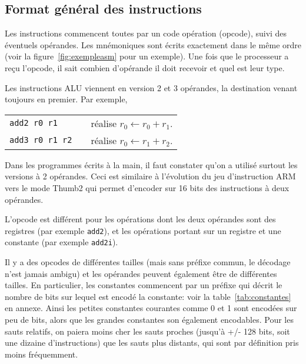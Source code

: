\documentclass[architecture]{compas2018}
\newcommand{\todo}[1]{\textcolor{red}{TODO: #1}}
\begin{document}

\subsection{Format général des instructions}
Les instructions commencent toutes par un code opération (opcode), suivi des éventuels opérandes.
Les mnémoniques sont écrits exactement dans le même ordre (voir la figure~\ref{fig:exempleasm} pour un exemple).  
Une fois que le processeur a reçu l'opcode, il sait combien d'opérande il doit recevoir et quel est leur type.


Les instructions ALU viennent en version 2 et 3 opérandes, la destination venant toujours en premier.
Par exemple, \\
  \begin{tabular}{lcl}
 \texttt{add2 r0 r1}&& réalise $r_0 \leftarrow r_0+r_1$. \\
 \texttt{add3 r0 r1 r2}&& réalise $r_0 \leftarrow r_1+r_2$.
  \end{tabular}
  
  Dans les programmes écrits à la main, il faut constater qu'on a utilisé surtout les versions à 2 opérandes.
  Ceci est similaire à l'évolution du jeu d'instruction ARM vers le mode Thumb2 qui permet d'encoder sur 16 bits des instructions à deux opérandes. 
  
 L'opcode est différent pour les opérations dont les deux opérandes  sont des registres (par exemple \texttt{add2}), et les opérations portant sur un registre et une constante (par exemple \texttt{add2i}).

Il y a des opcodes de différentes tailles (mais sans préfixe commun, le décodage n'est jamais ambigu)  et les opérandes peuvent également être de différentes tailles.
En particulier, les constantes commencent par un préfixe qui décrit le nombre de bits sur lequel est encodé la constante: voir la table~\ref{tab:constantes} en annexe.
Ainsi les petites constantes courantes comme 0 et 1 sont encodées sur peu de bits, alors que les grandes constantes son également encodables.
Pour les sauts relatifs, on paiera moins cher les sauts proches (jusqu'à +/- 128 bits, soit une dizaine d'instructions) que les sauts plus distants, qui sont par définition pris moins fréquemment.
\end{document}
